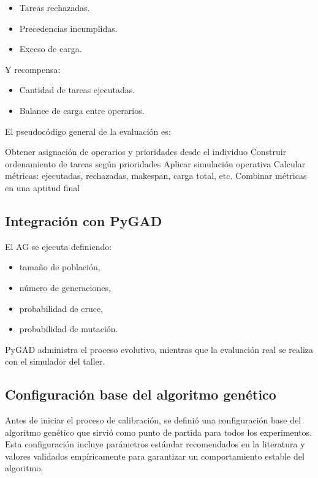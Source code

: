 \begin{itemize}
    \item Tareas rechazadas.
    \item Precedencias incumplidas.
    \item Exceso de carga.
\end{itemize}

Y recompensa:

\begin{itemize}
    \item Cantidad de tareas ejecutadas.
    \item Balance de carga entre operarios.
\end{itemize}

El pseudocódigo general de la evaluación es:

\begin{algorithm}[H]
\SetAlgoLined
Obtener asignación de operarios y prioridades desde el individuo\;
Construir ordenamiento de tareas según prioridades\;
Aplicar simulación operativa\;
Calcular métricas: ejecutadas, rechazadas, makespan, carga total, etc.\;
Combinar métricas en una aptitud final\;
\caption{Evaluación de un individuo mediante simulación operativa}
\end{algorithm}

\subsection{Integración con PyGAD}

El AG se ejecuta definiendo:
\begin{itemize}
    \item tamaño de población,
    \item número de generaciones,
    \item probabilidad de cruce,
    \item probabilidad de mutación.
\end{itemize}

PyGAD administra el proceso evolutivo, mientras que la evaluación real se realiza con el simulador del taller.

\subsection{Configuración base del algoritmo genético}
\label{subsec:configuracion-ag}

Antes de iniciar el proceso de calibración, se definió una configuración base del algoritmo genético que sirvió como punto de partida para todos los experimentos. Esta configuración incluye parámetros estándar recomendados en la literatura y valores validados empíricamente para garantizar un comportamiento estable del algoritmo.

